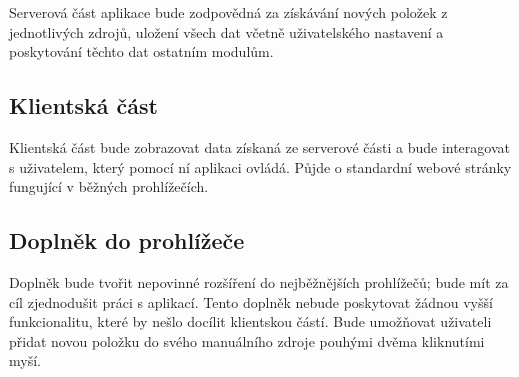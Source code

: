 Serverová část aplikace bude zodpovědná za získávání nových položek z jednotlivých zdrojů, uložení všech dat včetně uživatelského nastavení a poskytování těchto dat ostatním modulům.

\subsection{Klientská část}

Klientská část bude zobrazovat data získaná ze serverové části a bude interagovat s uživatelem, který pomocí ní aplikaci ovládá.
Půjde o standardní webové stránky fungující v běžných prohlížečích.

\subsection{Doplněk do prohlížeče}

Doplněk bude tvořit nepovinné rozšíření do nejběžnějších prohlížečů; bude mít za cíl zjednodušit práci s aplikací.
Tento doplněk nebude poskytovat žádnou vyšší funkcionalitu, které by nešlo docílit klientskou částí.
Bude umožňovat uživateli přidat novou položku do svého manuálního zdroje pouhými dvěma kliknutími myší.

